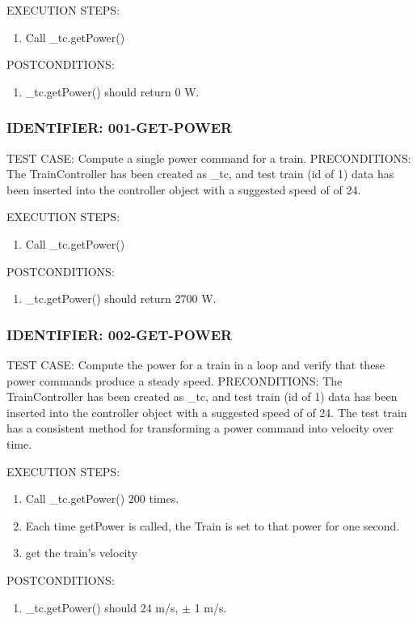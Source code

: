 \documentclass{scrreprt}
\begin{document}
EXECUTION STEPS:
\begin{enumerate}
	\item Call _tc.getPower()
\end{enumerate}
POSTCONDITIONS:
\begin{enumerate}
	\item _tc.getPower() should return 0 W.
\end{enumerate}

\subsubsection{IDENTIFIER: 001-GET-POWER}
TEST CASE: Compute a single power command for a train.
PRECONDITIONS: The TrainController has been created as _tc, and test train (id of 1) data has been inserted into the controller object with a suggested speed of of 24.

EXECUTION STEPS:
\begin{enumerate}
	\item Call _tc.getPower()
\end{enumerate}
POSTCONDITIONS:
\begin{enumerate}
	\item _tc.getPower() should return 2700 W.
\end{enumerate}

\subsubsection{IDENTIFIER: 002-GET-POWER}
TEST CASE: Compute the power for a train in a loop and verify that these power commands produce a steady speed.
PRECONDITIONS: The TrainController has been created as _tc, and test train (id of 1) data has been inserted into the controller object with a suggested speed of of 24.  The test train has a consistent method for transforming a power command into velocity over time.

EXECUTION STEPS:
\begin{enumerate}
	\item Call _tc.getPower() 200 times.
	\item Each time getPower is called, the Train is set to that power for one second.
	\item get the train's velocity
\end{enumerate}
POSTCONDITIONS:
\begin{enumerate}
	\item _tc.getPower() should 24 m/s, $\pm$ 1 m/s.
\end{enumerate}
\end{document}
